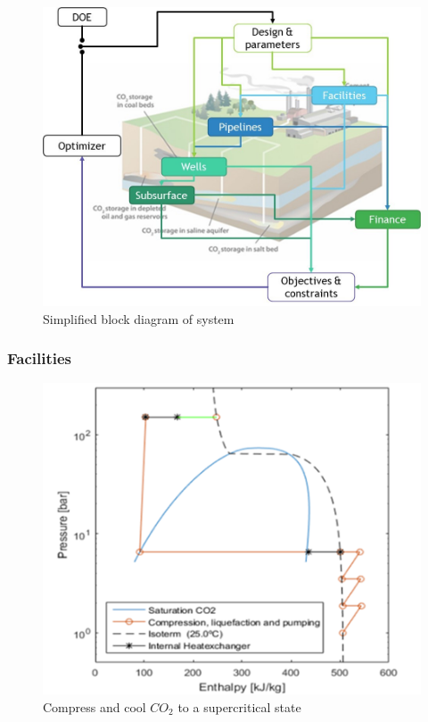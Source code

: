 \documentclass[balance,upint,subscriptcorrection,varvw,mathalfa=cal=boondoxo,spanish,french,vietnamese,russian,greek,pdf-a,colorlinks]{asmeconf}
\begin{document}
\begin{figure}[h!]
\centering\includegraphics[width=0.99\linewidth]{images/Block_diagram_overlay.jpg}
\caption{Simplified block diagram of system}\label{bd_overlay:1}
\end{figure}

\subsubsection{Facilities}
\begin{figure}[h!]
\centering\includegraphics[width=0.4\linewidth]{images/enthalpy_diagram.png}
\caption{Compress and cool \begin{math}{CO_2} \end{math} to a supercritical state}\label{enthalpy_diagram:1}
\end{figure}

 
\end{document}
